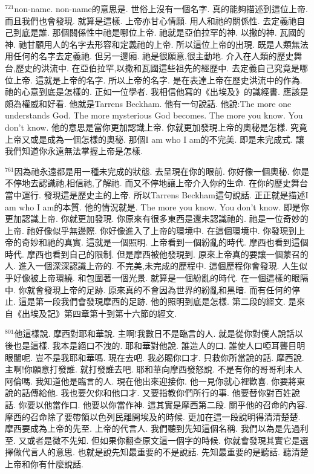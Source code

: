 \documentclass{book}
\begin{document}
$^{721}$non-name.
non-name的意思是.
世俗上沒有一個名字.
真的能夠描述到這位上帝.
而且我們也會發現.
就算是這樣.
上帝亦甘心情願.
用人和祂的關係性.
去定義祂自己到底是誰.
那個關係性中祂是哪位上帝.
祂就是亞伯拉罕的神.
以撒的神.
瓦國的神.
祂甘願用人的名字去形容和定義祂的上帝.
所以這位上帝的出現.
既是人類無法用任何的名字去定義祂.
但另一邊廂.
祂是很願意,很主動地.
介入在人類的歷史舞台,歷史的洪流中.
在亞伯拉罕,以撒和瓦國這些祖先的經歷中.
去定義自己究竟是哪位上帝.
這就是上帝的名字.
所以上帝的名字.
是在表達上帝在歷史洪流中的作為.
祂的心意到底是怎樣的.
正如一位學者.
我相信他寫的《出埃及》的識經書.
應該是頗為權威和好看.
他就是Tarrens Beckham.
他有一句說話.
他說:The more one understands God.
The more mysterious God becomes.
The more you know.
You don't know.
他的意思是當你更加認識上帝.
你就更加發現上帝的奧秘是怎樣.
究竟上帝又或是成為一個怎樣的奧秘.
那個I am who I am的不完美.
即是未完成式.
讓我們知道你永遠無法掌握上帝是怎樣.

$^{761}$因為祂永遠都是用一種未完成的狀態.
去呈現在你的眼前.
你好像一個奧秘.
你是不停地去認識祂,相信祂,了解祂.
而又不停地讓上帝介入你的生命.
在你的歷史舞台當中運行.
發現這是歷史主的上帝.
所以Tarrens Beckham這句說話.
正正就是描述I am who I am的本質.
他的情況就是.
The more you know.
You don't know.
即是你更加認識上帝.
你就更加發現.
你原來有很多東西是還未認識祂的.
祂是一位奇妙的上帝.
祂好像似乎無邊際.
你好像進入了上帝的環境中.
在這個環境中.
你發現到上帝的奇妙和祂的真實.
這就是一個照明.
上帝看到一個紛亂的時代.
摩西也看到這個時代.
摩西也看到自己的限制.
但是摩西被他發現到.
原來上帝真的要讓一個蒙召的人.
進入一個深深認識上帝的.
不完美,未完成的歷程中.
這個歷程你會發現.
人生似乎好像被上帝環繞.
和包圍著一個光景.
就算是一個紛亂的時代.
在一個這樣的眼隔中.
你就會發現上帝的足跡.
原來真的不會因為世界的紛亂和黑暗.
而有任何的停止.
這是第一段我們會發現摩西的足跡.
他的照明到底是怎樣.
第二段的經文.
是來自《出埃及記》第四章第十到第十六節的經文.

$^{801}$他這樣說.
摩西對耶和華說.
主啊!我數日不是臨言的人.
就是從你對僕人說話以後也是這樣.
我本是絕口不洩的.
耶和華對他說.
誰造人的口.
誰使人口啞耳聾目明眼闔呢.
豈不是我耶和華嗎.
現在去吧.
我必賜你口才.
只救你所當說的話.
摩西說.
主啊!你願意打發誰.
就打發誰去吧.
耶和華向摩西發怒說.
不是有你的哥哥利未人阿倫嗎.
我知道他是臨言的人.
現在他出來迎接你.
他一見你就心裡歡喜.
你要將東說的話傳給他.
我也要欠你和他口才.
又要指教你們所行的事.
他要替你對百姓說話.
你要以他當作口.
他要以你當作神.
這其實是摩西第二段.
關乎他的召命的內容.
摩西的召命除了要帶領以色列民離開埃及的時候.
更加在這一段說明得清清楚楚.
摩西要成為上帝的先至.
上帝的代言人.
我們聽到先知這個名稱.
我們以為是先過利至.
又或者是微不先知.
但如果你翻查原文這一個字的時候.
你就會發現其實它是選擇做代言人的意思.
也就是說先知最重要的不是說話.
先知最重要的是聽話.
聽清楚上帝和你有什麼說話.
\end{document}
